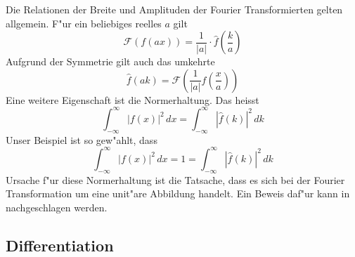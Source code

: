 \begin{refsection}
Die Relationen der Breite und Amplituden der Fourier Transformierten gelten allgemein. F"ur ein beliebiges reelles $a$ gilt
\begin{equation}
\mathcal{F}(f(ax)) = \frac{1}{|a|}\cdot\hat{f}\left( \frac{k}{a}\right) 
\end{equation}
Aufgrund der Symmetrie gilt auch das umkehrte
\begin{equation}
\hat{f}(ak) = \mathcal{F}\left( \frac{1}{|a|}f\left( \frac{x}{a}\right) \right) 
\end{equation}
Eine weitere Eigenschaft ist die Normerhaltung. Das heisst
\begin{equation}
\int_{-\infty}^{\infty}|f(x)|^{2} \, dx = \int_{-\infty}^{\infty}|\hat{f}(k)|^{2} \, dk
\end{equation}
Unser Beispiel ist so gew"ahlt, dass
\begin{equation}
\int_{-\infty}^{\infty}|f(x)|^{2} \, dx = 1 = \int_{-\infty}^{\infty}|\hat{f}(k)|^{2} \, dk
\end{equation}
Ursache f"ur diese Normerhaltung ist die Tatsache, dass es sich bei der Fourier Transformation um eine unit"are Abbildung handelt.
Ein Beweis daf"ur kann in \cite{skript:QuantenmechanikMotschmann} nachgeschlagen werden.

\subsection{Differentiation}
\label{chapter:ftrans_differentation}


\end{refsection}
